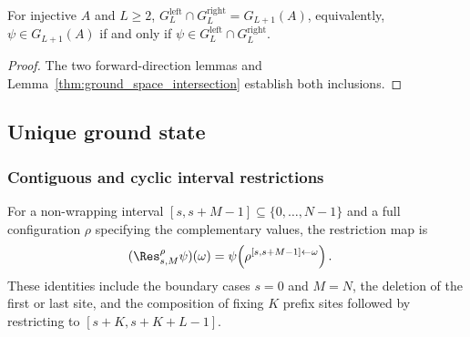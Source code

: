 \begin{theorem}\label{thm:ground_space_iff}
    \leanok
    For injective $A$ and $L \ge 2$,
    $G_L^{\mathrm{left}}\cap G_L^{\mathrm{right}} = G_{L+1}(A)$,
    equivalently, $\psi \in G_{L+1}(A)$ if and only if
    $\psi \in G_L^{\mathrm{left}}\cap G_L^{\mathrm{right}}$.
\end{theorem}

\begin{proof}
    \leanok
    The two forward-direction lemmas and
    Lemma~\ref{thm:ground_space_intersection} establish both inclusions.
\end{proof}

\subsection{Unique ground state}

\subsubsection{Contiguous and cyclic interval restrictions}

\begin{remark}\label{rem:contiguous_window_operators}
    \leanok
    For a non-wrapping interval $[s,s+M-1] \subseteq \{0,\ldots,N-1\}$ and a
    full configuration $\rho$ specifying the complementary values, the
    restriction map is
    \begin{align}
        (\Res^\rho_{s,M}\psi)(\omega)
         & = \psi\!\left(\rho^{[s,s+M-1]\leftarrow\omega}\right).
        \notag
    \end{align}
    These identities include the boundary cases $s=0$ and $M=N$, the deletion
    of the first or last site, and the composition of fixing $K$ prefix sites
    followed by restricting to $[s+K,s+K+L-1]$.
\end{remark}

